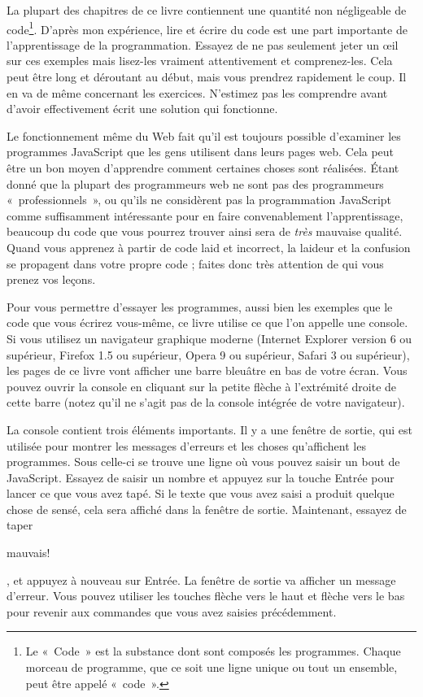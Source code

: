 \documentclass{FramateX}
\renewcommand{\texttt}[1]{\begin{sffamily}{#1}\end{sffamily}}
\begin{document}
\begin{center}\end{center}

La plupart des chapitres de ce livre contiennent une quantité non
négligeable de code\footnote{Le «~Code~» est la substance dont sont composés les programmes. Chaque morceau de programme, que ce soit une ligne unique ou tout un ensemble, peut être appelé «~code~».}. D'après mon expérience, lire
et écrire du code est une part importante de l'apprentissage de la
programmation. Essayez de ne pas seulement jeter un œil sur ces exemples
mais lisez-les vraiment attentivement et comprenez-les. Cela peut être
long et déroutant au début, mais vous prendrez rapidement le coup. Il en
va de même concernant les exercices. N'estimez pas les comprendre avant
d'avoir effectivement écrit une solution qui fonctionne.

Le fonctionnement même du Web fait qu'il est toujours possible
d'examiner les programmes JavaScript que les gens utilisent dans leurs
pages web. Cela peut être un bon moyen d'apprendre comment certaines
choses sont réalisées. Étant donné que la plupart des programmeurs web
ne sont pas des programmeurs «~professionnels~», ou qu'ils ne
considèrent pas la programmation JavaScript comme suffisamment
intéressante pour en faire convenablement l'apprentissage, beaucoup du
code que vous pourrez trouver ainsi sera de \emph{très} mauvaise
qualité. Quand vous apprenez à partir de code laid et incorrect, la
laideur et la confusion se propagent dans votre propre code ; faites
donc très attention de qui vous prenez vos leçons.

\begin{center}\end{center}

Pour vous permettre d'essayer les programmes, aussi bien les exemples
que le code que vous écrirez vous-même, ce livre utilise ce que l'on
appelle une console. Si vous utilisez un navigateur graphique moderne
(Internet Explorer version 6 ou supérieur, Firefox 1.5 ou supérieur,
Opera 9 ou supérieur, Safari 3 ou supérieur), les pages de ce livre vont
afficher une barre bleuâtre en bas de votre écran. Vous pouvez ouvrir la
console en cliquant sur la petite flèche à l'extrémité droite de cette
barre (notez qu'il ne s'agit pas de la console intégrée de votre
navigateur).

La console contient trois éléments importants. Il y a une fenêtre de
sortie, qui est utilisée pour montrer les messages d'erreurs et les
choses qu'affichent les programmes. Sous celle-ci se trouve une ligne où
vous pouvez saisir un bout de JavaScript. Essayez de saisir un nombre et
appuyez sur la touche Entrée pour lancer ce que vous avez tapé. Si le
texte que vous avez saisi a produit quelque chose de sensé, cela sera
affiché dans la fenêtre de sortie. Maintenant, essayez de taper
\texttt{mauvais!}, et appuyez à nouveau sur Entrée. La fenêtre de sortie
va afficher un message d'erreur. Vous pouvez utiliser les touches flèche
vers le haut et flèche vers le bas pour revenir aux commandes que vous
avez saisies précédemment.
\end{document}
